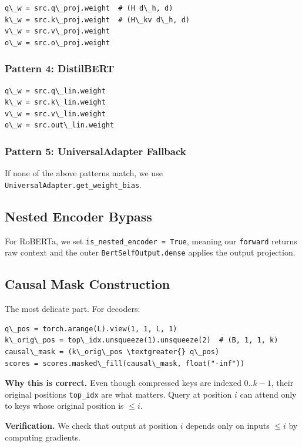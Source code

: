 \begin{lstlisting}
q\_w = src.q\_proj.weight  # (H d\_h, d)
k\_w = src.k\_proj.weight  # (H\_kv d\_h, d)
v\_w = src.v\_proj.weight
o\_w = src.o\_proj.weight
\end{lstlisting}

\subsubsection{Pattern 4: DistilBERT}

\begin{lstlisting}
q\_w = src.q\_lin.weight
k\_w = src.k\_lin.weight
v\_w = src.v\_lin.weight
o\_w = src.out\_lin.weight
\end{lstlisting}

\subsubsection{Pattern 5: UniversalAdapter Fallback}

If none of the above patterns match, we use \texttt{UniversalAdapter.get\_weight\_bias}.

\subsection{Nested Encoder Bypass}

For RoBERTa, we set \texttt{is\_nested\_encoder = True}, meaning our \texttt{forward} returns 
raw context and the outer \texttt{BertSelfOutput.dense} applies the output projection.

\subsection{Causal Mask Construction}

The most delicate part. For decoders:

\begin{lstlisting}
q\_pos = torch.arange(L).view(1, 1, L, 1)
k\_orig\_pos = top\_idx.unsqueeze(1).unsqueeze(2)  # (B, 1, 1, k)
causal\_mask = (k\_orig\_pos \textgreater{} q\_pos)
scores = scores.masked\_fill(causal\_mask, float("-inf"))
\end{lstlisting}

\textbf{Why this is correct.} Even though compressed keys are indexed $0..k-1$, 
their original positions \texttt{top\_idx} are what matters. Query at position $i$ 
can attend only to keys whose original position is $\leq i$.

\textbf{Verification.} We check that output at position $i$ depends only on 
inputs $\leq i$ by computing gradients.

